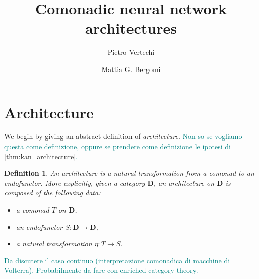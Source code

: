 \documentclass[12pt]{article}
\title{Comonadic neural network architectures}
\author{
    Pietro Vertechi \and Mattia G. Bergomi
}
\date{}
\newtheorem{definition}{Definition}
\newcommand{\pietro}[1]{\textcolor{teal}{#1}}
\newcommand{\DCat}{{\mathbf{D}}}
\begin{document}
\maketitle
\begin{abstract}
\end{abstract}

\section{Architecture}

We begin by giving an abstract definition of {\em architecture}. \pietro{Non so se vogliamo questa come definizione, oppure se prendere come definizione le ipotesi di \cref{thm:kan_architecture}.}

\begin{definition}\label{def:architecture}
    An {\em architecture} is a natural transformation from a comonad to an endofunctor. More explicitly, given a category $\DCat$, an {\em architecture} on $\DCat$ is composed of the following data:
    \begin{itemize}
        \item a comonad $T$ on $\DCat$,
        \item an endofunctor $S \colon \DCat \rightarrow \DCat$,
        \item a natural transformation $\eta \colon T \rightarrow S$.
    \end{itemize}
\end{definition}


\pietro{Da discutere il caso continuo (interpretazione comonadica di macchine di Volterra). Probabilmente da fare con enriched category theory.}
\end{document}
